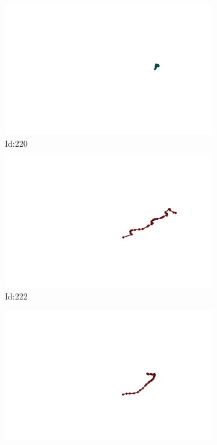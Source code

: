 \documentclass[12pt,twoside]{report}
\begin{document}
\begin{figure}
\centering
\begin{subfigure}[b]{0.20\textwidth}
\centering
\includegraphics[width=\textwidth]{../../trajectories/220.png}
\caption{Id:220}
\end{subfigure}
\begin{subfigure}[b]{0.20\textwidth}
\centering
\includegraphics[width=\textwidth]{../../trajectories/222.png}
\caption{Id:222}
\end{subfigure}
\begin{subfigure}[b]{0.20\textwidth}
\centering
\includegraphics[width=\textwidth]{../../trajectories/320.png}

\end{subfigure}
\end{figure}
\end{document}
